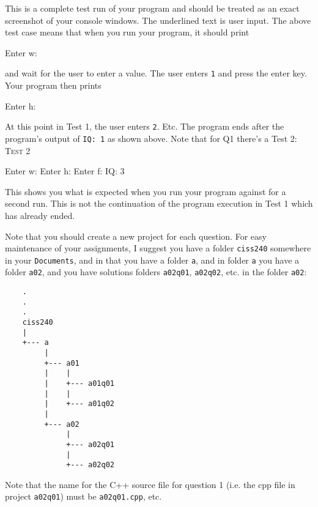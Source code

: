 This is a complete test run of your program and should be treated as an exact
screenshot of your console windows.
The underlined text is user input. 
The above test case means that when you run your program, it should print
\begin{console} 
Enter w: 
\end{console}
and wait for the user to enter a value. 
The user enters \verb!1! and press the enter key. 
Your program then prints
\begin{console}
Enter h: 
\end{console}
At this point in Test 1, the user enters \verb!2!. Etc.  
The program ends after the program's output of \verb!IQ: 1! as shown above.
Note that for Q1 there's a Test 2:
\textsc{Test 2}
\begin{console}[commandchars=\\\{\}]
Enter w: 
Enter h: 
Enter f: 
IQ: 3
\end{console}
This shows you what is expected when you run your program against
for a second run.
This is not the continuation of the program execution
in Test 1 which has already ended.

Note that you should create a new project for each question. 
For easy maintenance of your assignments, 
I suggest you have a folder \verb!ciss240! somewhere in your 
\verb!Documents!, and in that you have a folder \verb!a!, 
and in folder \verb!a! you have a folder \verb!a02!, 
and you have solutions folders \verb!a02q01!, \verb!a02q02!, etc. in the 
folder \verb!a02!:

\begin{Verbatim}
    .
    .
    .
    ciss240
    |
    +--- a
         |
         +--- a01
         |    |
         |    +--- a01q01
         |    |
         |    +--- a01q02
         |
         +--- a02
              |
              +--- a02q01
              |
              +--- a02q02
\end{Verbatim}

Note that the name for the C++ source file for question 1 
(i.e. the cpp file in 
project \verb!a02q01!) must be \verb!a02q01.cpp!, etc.

